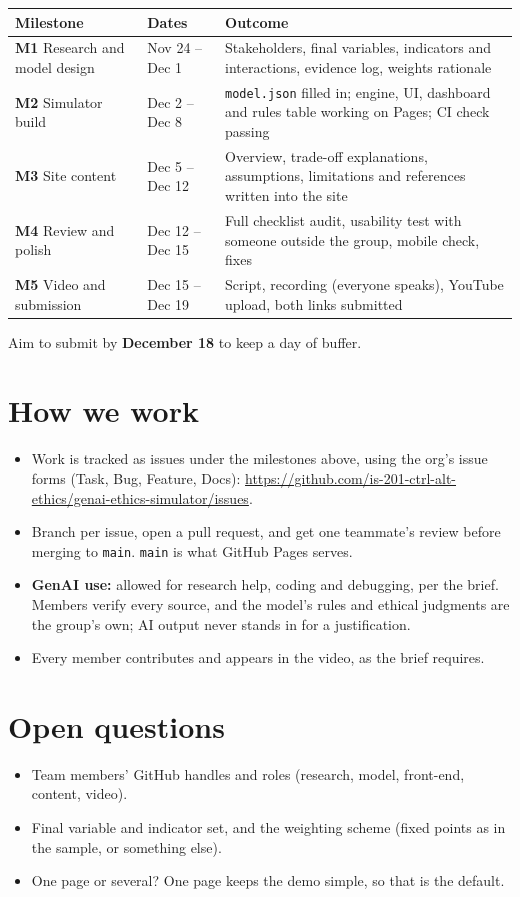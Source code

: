 \documentclass[11pt,a4paper]{article}
\newcommand{\code}[1]{\texttt{#1}}
\newcommand{\repo}{https://github.com/is-201-ctrl-alt-ethics/genai-ethics-simulator}
\begin{document}
\begin{tabularx}{\textwidth}{@{}>{\raggedright\arraybackslash}p{4.4cm}p{2.7cm}L@{}}
\toprule
\textbf{Milestone} & \textbf{Dates} & \textbf{Outcome} \\
\midrule
\textbf{M1} Research and model design & Nov 24 -- Dec 1 & Stakeholders, final variables, indicators and interactions, evidence log, weights rationale \\
\textbf{M2} Simulator build & Dec 2 -- Dec 8 & \code{model.json} filled in; engine, UI, dashboard and rules table working on Pages; CI check passing \\
\textbf{M3} Site content & Dec 5 -- Dec 12 & Overview, trade-off explanations, assumptions, limitations and references written into the site \\
\textbf{M4} Review and polish & Dec 12 -- Dec 15 & Full checklist audit, usability test with someone outside the group, mobile check, fixes \\
\textbf{M5} Video and submission & Dec 15 -- Dec 19 & Script, recording (everyone speaks), YouTube upload, both links submitted \\
\bottomrule
\end{tabularx}

Aim to submit by \textbf{December 18} to keep a day of buffer.

\section{How we work}
\begin{itemize}
  \item Work is tracked as issues under the milestones above, using the org's issue forms (Task,
        Bug, Feature, Docs): \url{\repo/issues}.
  \item Branch per issue, open a pull request, and get one teammate's review before merging to
        \code{main}. \code{main} is what GitHub Pages serves.
  \item \textbf{GenAI use:} allowed for research help, coding and debugging, per the brief. Members
        verify every source, and the model's rules and ethical judgments are the group's own; AI
        output never stands in for a justification.
  \item Every member contributes and appears in the video, as the brief requires.
\end{itemize}

\section{Open questions}
\begin{itemize}
  \item Team members' GitHub handles and roles (research, model, front-end, content, video).
  \item Final variable and indicator set, and the weighting scheme (fixed points as in the sample,
        or something else).
  \item One page or several? One page keeps the demo simple, so that is the default.
\end{itemize}
\end{document}
